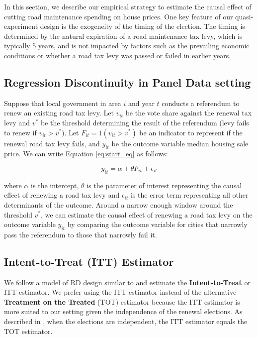 In this section, we describe our empirical strategy to estimate the causal effect of cutting road maintenance spending on house prices. One key feature of our quasi-experiment design is the exogeneity of the timing of the election. The timing is determined by the natural expiration of a road maintenance tax levy, which is typically 5 years, and is not impacted by factors such as the prevailing economic conditions or whether a road tax levy was passed or failed in earlier years.

\subsection{Regression Discontinuity in Panel Data setting}

Suppose that local government in area $i$ and year $t$ conducts a referendum to renew an existing road tax levy. Let $v_{it}$ be the vote share against the renewal tax levy and  $v^*$ be the threshold determining the result of the referendum (levy fails to renew if $v_{it} > v^*$). Let $F_{it} = 1(v_{it} > v^*)$ be an indicator to represent if the renewal road tax levy fails, and $y_{it}$ be the outcome variable median housing sale price. We can write Equation \ref{eq:start_eq} as follows:

\begin{equation}
y_{it} = \alpha + \theta F_{it} + \epsilon_{it}
\label{eq:start_eq}
\end{equation}

\noindent where $\alpha$ is the intercept, $\theta$ is the parameter of interest representing the causal effect of renewing a road tax levy and $\epsilon_{it}$ is the error term representing all other determinants of the outcome. Around a narrow enough window around the threshold $v^*$, we can estimate the causal effect of renewing a road tax levy on the outcome variable $y_{it}$ by comparing the outcome variable for cities that narrowly pass the referendum to those that narrowly fail it.

\subsection{Intent-to-Treat (ITT) Estimator}

We follow a model of RD design similar to \cite{cellini2010value} and estimate the {\bf Intent-to-Treat} or ITT estimator. We prefer using the ITT estimator instead of the alternative {\bf Treatment on the Treated} (TOT) estimator because the ITT estimator is more suited to our setting given the independence of the renewal elections. As described in \cite{cellini2010value}, when the elections are independent, the ITT estimator equals the TOT estimator.

